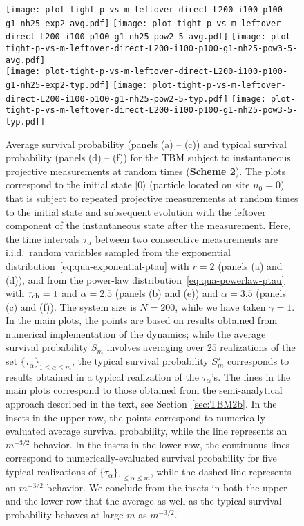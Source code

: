 \documentclass[12pt]{iopart}
\def\ra{\rangle}
\begin{document}
\begin{figure}[!htbp]
\centering
\texttt{[image: plot-tight-p-vs-m-leftover-direct-L200-i100-p100-g1-nh25-exp2-avg.pdf]} \hskip1pt 
\texttt{[image: plot-tight-p-vs-m-leftover-direct-L200-i100-p100-g1-nh25-pow2-5-avg.pdf]}  \hskip1pt 
\texttt{[image: plot-tight-p-vs-m-leftover-direct-L200-i100-p100-g1-nh25-pow3-5-avg.pdf]}  \\[2ex]
\texttt{[image: plot-tight-p-vs-m-leftover-direct-L200-i100-p100-g1-nh25-exp2-typ.pdf]}    \hskip1pt 
\texttt{[image: plot-tight-p-vs-m-leftover-direct-L200-i100-p100-g1-nh25-pow2-5-typ.pdf]}   \hskip1pt  
\texttt{[image: plot-tight-p-vs-m-leftover-direct-L200-i100-p100-g1-nh25-pow3-5-typ.pdf]}
\caption{Average survival probability (panels (a) -- (c)) and
        typical survival probability (panels (d) -- (f)) for the TBM subject to instantaneous projective measurements at random times
(\textbf{Scheme 2}). The plots correspond to the initial state $|0\ra$
        (particle located on site $n_0=0$) that is subject to repeated projective
measurements at random times to the initial state and subsequent
        evolution with the leftover component of the
        instantaneous state after the measurement. Here, the time intervals $\tau_\alpha$ between two consecutive
measurements are i.i.d.~random variables sampled from the exponential
distribution~\eqref{eq:qua-exponential-ptau} with $r=2$ (panels (a) and
        (d)), and from the power-law distribution~\eqref{eq:qua-powerlaw-ptau} with $\tau_{\rm ch} = 1$ and 
        $\alpha=2.5$ (panels (b) and (e)) and $\alpha=3.5$ (panels (c) and (f)). The system size
        is $N=200$, while we have taken $\gamma=1$. In the main plots, the points are based on results
        obtained from numerical implementation of the dynamics; while
        the average survival probability $\overline{S_m}$ involves
        averaging over $25$ realizations of the set $\{\tau_\alpha\}_{1\le
        \alpha \le m}$, the typical survival probability $S_m^\star$
        corresponds to results obtained in a typical realization of the
        $\tau_\alpha$'s. The lines in the main plots correspond to those
        obtained from the semi-analytical approach described in the
        text, see Section~\ref{sec:TBM2b}. In the insets in the upper
        row, the points correspond to numerically-evaluated average
        survival probability, while the line represents an $m^{-3/2}$
        behavior. In the insets in the lower
        row, the continuous lines correspond to numerically-evaluated
        survival probability for five typical realizations of
        $\{\tau_\alpha\}_{1\le \alpha \le m}$, while the dashed line
        represents an $m^{-3/2}$ behavior. We conclude from the insets
        in both the upper and the lower row that the average as well as the typical
        survival probability behaves at large $m$ as $m^{-3/2}$.} 
\label{fig:qua-tbm-left}
\end{figure}
\end{document}
